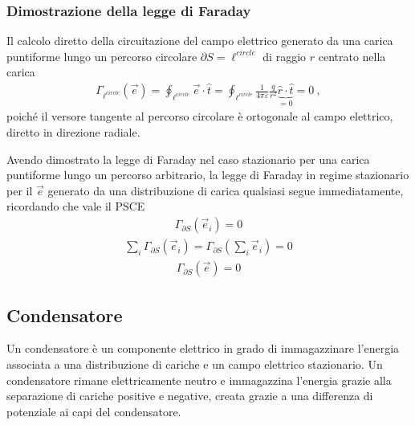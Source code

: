 \documentclass[letterpaper,10pt,italian]{jupyterBook}
\begin{document}
\subsubsection*{Dimostrazione della legge di Faraday}

\sphinxAtStartPar
{}
Il calcolo diretto della circuitazione del campo elettrico generato da una carica puntiforme lungo un percorso circolare \(\partial S = \ell^{circle}\) di raggio \(r\) centrato nella carica
\begin{equation*}
\begin{split}\Gamma_{\ell^{circle}}(\vec{e}) = \oint_{\ell^{circle}} \vec{e} \cdot \hat{t} = \oint_{\ell^{circle}} \frac{1}{4 \pi \varepsilon}\frac{q}{r^2} \underbrace{\hat{r} \cdot \hat{t}}_{=0} = 0 \ ,  \end{split}
\end{equation*}
\sphinxAtStartPar
poiché il versore tangente al percorso circolare è ortogonale al campo elettrico, diretto in direzione radiale.

\sphinxAtStartPar
{}

\sphinxAtStartPar
{}
Avendo dimostrato la legge di Faraday nel caso stazionario per una carica puntiforme lungo un percorso arbitrario, la legge di Faraday in regime stazionario per il \(\vec{e}\) generato da una distribuzione di carica qualsiasi segue immediatamente, ricordando che vale il PSCE
\begin{equation*}
\begin{split}\Gamma_{\partial S}(\vec{e}_i) = 0\end{split}
\end{equation*}\begin{equation*}
\begin{split}\sum_i \Gamma_{\partial S}(\vec{e}_i) = \Gamma_{\partial S} \left(\sum_i \vec{e}_i \right) = 0\end{split}
\end{equation*}\begin{equation*}
\begin{split}\Gamma_{\partial S}(\vec{e}) = 0\end{split}
\end{equation*}

\subsection{Condensatore}
\label{\detokenize{ch/electromagnetism/electrostatics:condensatore}}\label{\detokenize{ch/electromagnetism/electrostatics:physics-hs-electromagnetism-electrostatics-capacitor}}\label{\detokenize{ch/electromagnetism/electrostatics:physics-hs-electromagnetism-lorentz-electric}}
\sphinxAtStartPar
Un condensatore è un componente elettrico in grado di immagazzinare l’energia associata a una distribuzione di cariche e un campo elettrico stazionario. Un condensatore rimane elettricamente neutro e immagazzina l’energia grazie alla separazione di cariche positive e negative, creata grazie a una differenza di potenziale ai capi del condensatore.
\end{document}
